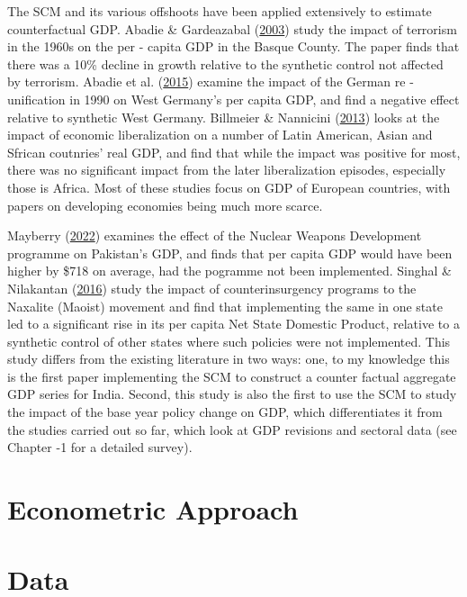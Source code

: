\documentclass[12pt,nobind, a4paper]{reedthesis}
\begin{document}
 The SCM and its various offshoots have been applied extensively to estimate counterfactual GDP. Abadie \& Gardeazabal (\protect\hyperlink{ref-abadie_economic_2003}{2003}) study the impact of terrorism in the 1960s on the per - capita GDP in the Basque County. The paper finds that there was a 10\% decline in growth relative to the synthetic control not affected by terrorism. Abadie et al. (\protect\hyperlink{ref-abadie_comparative_2015}{2015}) examine the impact of the German re - unification in 1990 on West Germany's per capita GDP, and find a negative effect relative to synthetic West Germany. Billmeier \& Nannicini (\protect\hyperlink{ref-billmeier_assessing_2013}{2013}) looks at the impact of economic liberalization on a number of Latin American, Asian and Sfrican coutnries' real GDP, and find that while the impact was positive for most, there was no significant impact from the later liberalization episodes, especially those is Africa. Most of these studies focus on GDP of European countries, with papers on developing economies being much more scarce.
 \linebreak

 Mayberry (\protect\hyperlink{ref-mayberry_economic_2022}{2022}) examines the effect of the Nuclear Weapons Development programme on Pakistan's GDP, and finds that per capita GDP would have been higher by \$718 on average, had the pogramme not been implemented. Singhal \& Nilakantan (\protect\hyperlink{ref-singhal_economic_2016}{2016}) study the impact of counterinsurgency programs to the Naxalite (Maoist) movement and find that implementing the same in one state led to a significant rise in its per capita Net State Domestic Product, relative to a synthetic control of other states where such policies were not implemented. This study differs from the existing literature in two ways: one, to my knowledge this is the first paper implementing the SCM to construct a counter factual aggregate GDP series for India. Second, this study is also the first to use the SCM to study the impact of the base year policy change on GDP, which differentiates it from the studies carried out so far, which look at GDP revisions and sectoral data (see Chapter -1 for a detailed survey).

 \hypertarget{econometric-approach}{%
 \section{Econometric Approach}\label{econometric-approach}}

 \hypertarget{data}{%
 \section{Data}\label{data}}
\end{document}
